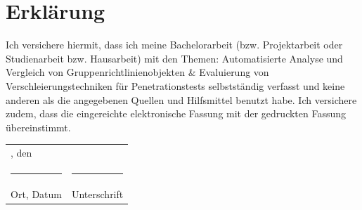 \section*{Erklärung}

Ich versichere hiermit, dass ich meine Bachelorarbeit (bzw. Projektarbeit oder Studienarbeit bzw.
Hausarbeit) mit den Themen: Automatisierte Analyse und Vergleich von Gruppenrichtlinienobjekten  \& Evaluierung von Verschleierungstechniken für Penetrationstests selbstständig verfasst und keine anderen als die angegebenen Quellen und Hilfsmittel benutzt habe. Ich versichere zudem, dass die eingereichte elektronische Fassung
mit der gedruckten Fassung übereinstimmt.\\
\begin{tabularx}{\textwidth}{ll}
    \location{}, den \turnindate{} &  \\
    \rule{7cm}{1pt} & \rule{5cm}{1pt}\\
    Ort, Datum & Unterschrift
\end{tabularx}
